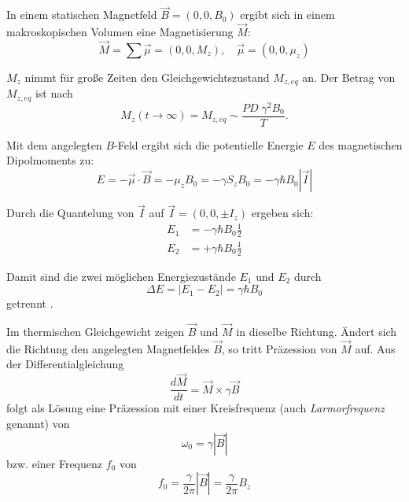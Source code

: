 In einem statischen Magnetfeld $\vec{B}=(0,0,B_0)$ ergibt sich in einem makroskopischen Volumen eine Magnetisierung $\vec{M}$:
\begin{equation}
	\vec{M} = \sum \vec{\mu} = (0,0,M_z), \quad \vec{\mu}=(0,0,\mu_z)
\end{equation}

$M_z$ nimmt für große Zeiten den Gleichgewichtszustand $M_{z,eq}$ an. Der Betrag von $M_{z,eq}$ ist nach \cite[S.~47]{Bushong2014}
\begin{equation}
	M_z(t \rightarrow \infty) = M_{z,eq} \sim \frac{PD\; \gamma^2 B_0}{T}.
\end{equation}

Mit dem angelegten $B$-Feld ergibt sich die potentielle Energie $E$ des magnetischen Dipolmoments zu:
\begin{equation}
	E=-\vec{\mu} \cdot \vec{B} = -\mu_z B_0 = -\gamma S_z B_0 = -\gamma \hbar B_0 |\vec{I}|
\end{equation}

Durch die Quantelung von $\vec{I}$ auf $\vec{I}=(0,0,\pm I_z)$ ergeben sich:
\begin{subequations}
	\begin{align}
	E_1 & = -\gamma \hbar B_0 \frac{1}{2} \\
	E_2 & = +\gamma \hbar B_0 \frac{1}{2}
	\end{align}
\end{subequations}

Damit sind die zwei möglichen Energiezustände $E_1$ und $E_2$ durch
\begin{equation}
	\Delta E = |E_1 - E_2| = \gamma \hbar B_0
\end{equation}
getrennt \cite[S.~ 56]{Nishimura1996}.

Im thermischen Gleichgewicht zeigen $\vec{B}$ und $\vec{M}$ in dieselbe Richtung. Ändert sich die Richtung den angelegten Magnetfeldes $\vec{B}$, so tritt Präzession von $\vec{M}$ auf. Aus der Differentialgleichung
\begin{equation}
\label{eq:Mdgl}
	\frac{d\vec{M}}{dt}=\vec{M} \times \gamma \vec{B}
\end{equation}
folgt als Lösung eine Präzession mit einer Kreisfrequenz (auch \textit{Larmorfrequenz} genannt) von
\begin{equation}
	\omega_0=\gamma |\vec{B}|
\end{equation}
bzw. einer Frequenz $f_0$ von
\begin{equation}
	f_0=\frac{\gamma}{2\pi} |\vec{B}| = \frac{\gamma}{2\pi} B_z
\end{equation}

